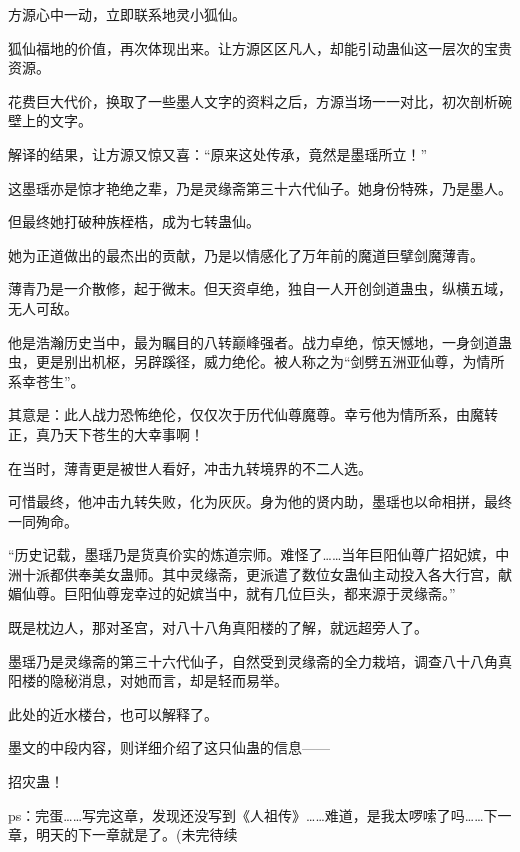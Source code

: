 \begin{this_body}
方源心中一动，立即联系地灵小狐仙。

狐仙福地的价值，再次体现出来。让方源区区凡人，却能引动蛊仙这一层次的宝贵资源。

花费巨大代价，换取了一些墨人文字的资料之后，方源当场一一对比，初次剖析碗壁上的文字。

解译的结果，让方源又惊又喜：“原来这处传承，竟然是墨瑶所立！”

这墨瑶亦是惊才艳绝之辈，乃是灵缘斋第三十六代仙子。她身份特殊，乃是墨人。

但最终她打破种族桎梏，成为七转蛊仙。

她为正道做出的最杰出的贡献，乃是以情感化了万年前的魔道巨擘剑魔薄青。

薄青乃是一介散修，起于微末。但天资卓绝，独自一人开创剑道蛊虫，纵横五域，无人可敌。

他是浩瀚历史当中，最为瞩目的八转巅峰强者。战力卓绝，惊天憾地，一身剑道蛊虫，更是别出机枢，另辟蹊径，威力绝伦。被人称之为“剑劈五洲亚仙尊，为情所系幸苍生”。

其意是：此人战力恐怖绝伦，仅仅次于历代仙尊魔尊。幸亏他为情所系，由魔转正，真乃天下苍生的大幸事啊！

在当时，薄青更是被世人看好，冲击九转境界的不二人选。

可惜最终，他冲击九转失败，化为灰灰。身为他的贤内助，墨瑶也以命相拼，最终一同殉命。

“历史记载，墨瑶乃是货真价实的炼道宗师。难怪了……当年巨阳仙尊广招妃嫔，中洲十派都供奉美女蛊师。其中灵缘斋，更派遣了数位女蛊仙主动投入各大行宫，献媚仙尊。巨阳仙尊宠幸过的妃嫔当中，就有几位巨头，都来源于灵缘斋。”

既是枕边人，那对圣宫，对八十八角真阳楼的了解，就远超旁人了。

墨瑶乃是灵缘斋的第三十六代仙子，自然受到灵缘斋的全力栽培，调查八十八角真阳楼的隐秘消息，对她而言，却是轻而易举。

此处的近水楼台，也可以解释了。

墨文的中段内容，则详细介绍了这只仙蛊的信息——

招灾蛊！

ps：完蛋……写完这章，发现还没写到《人祖传》……难道，是我太啰嗦了吗……下一章，明天的下一章就是了。(未完待续

\end{this_body}

